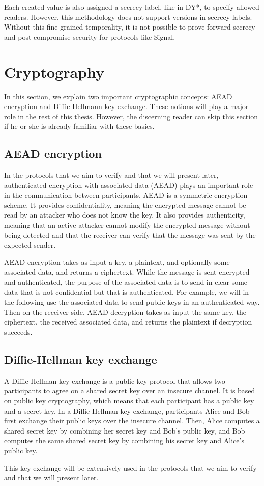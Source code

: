 Each created value is also assigned a secrecy label, like in DY*, to specify allowed readers.
However, this methodology does not support versions in secrecy labels.
Without this fine-grained temporality, it is not possible to prove forward secrecy and post-compromise security for protocols like Signal.

\section{Cryptography}
In this section, we explain two important cryptographic concepts: AEAD encryption and Diffie-Hellmann key exchange.
These notions will play a major role in the rest of this thesis. 
However, the discerning reader can skip this section if he or she is already familiar with these basics.

\subsection{AEAD encryption}
In the protocols that we aim to verify and that we will present later, authenticated encryption with associated data (AEAD) plays an important role in the communication between participants.
AEAD is a symmetric encryption scheme.
It provides confidentiality, meaning the encrypted message cannot be read by an attacker who does not know the key.
It also provides authenticity, meaning that an active attacker cannot modify the encrypted message without being detected and that the receiver can verify that the message was sent by the expected sender.

AEAD encryption takes as input a key, a plaintext, and optionally some associated data, and returns a ciphertext.
While the message is sent encrypted and authenticated, the purpose of the associated data is to send in clear some data that is not confidential but that is authenticated.
For example, we will in the following use the associated data to send public keys in an authenticated way.
Then on the receiver side, AEAD decryption takes as input the same key, the ciphertext, the received associated data, and returns the plaintext if decryption succeeds.

\subsection{Diffie-Hellman key exchange}

A Diffie-Hellman key exchange is a public-key protocol that allows two participants to agree on a shared secret key over an insecure channel.
It is based on public key cryptography, which means that each participant has a public key and a secret key.
In a Diffie-Hellman key exchange, participants Alice and Bob first exchange their public keys over the insecure channel.
Then, Alice computes a shared secret key by combining her secret key and Bob's public key, and Bob computes the same shared secret key by combining his secret key and Alice's public key.

This key exchange will be extensively used in the protocols that we aim to verify and that we will present later.